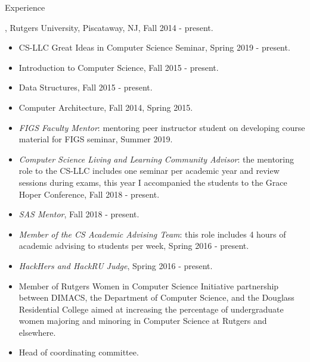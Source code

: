 \documentclass[10pt]{resume}
\begin{document}
\begin{category}{Experience}

  , Rutgers University, Piscataway, NJ, Fall 2014 - present.
  \begin{itemize}
    \item CS-LLC Great Ideas in Computer Science Seminar, Spring 2019 - present.
    \item Introduction to Computer Science, Fall 2015 - present.
    \item Data Structures, Fall 2015 - present.
    \item Computer Architecture, Fall 2014, Spring 2015.
  \end{itemize}

    \begin{itemize}
    \item {\em FIGS Faculty Mentor}: mentoring peer
      instructor student on developing course material for FIGS
      seminar, Summer 2019.
    \item {\em Computer Science Living and Learning Community Advisor}: the
      mentoring role to the CS-LLC includes one seminar per academic
      year and review sessions during exams, this year I 
      accompanied the students to the Grace Hoper Conference, Fall 2018 - present.
    \item {\em SAS Mentor}, Fall 2018 - present.
    \item {\em Member of the CS Academic Advising Team}: this role
      includes 4 hours of academic advising to students per week,
      Spring 2016 - present.
    \item {\em HackHers and HackRU Judge}, Spring 2016 - present.
    \end{itemize}

    \begin{itemize}
    \item Member of Rutgers Women in Computer Science Initiative partnership
      between DIMACS, the Department of Computer Science, and the
      Douglass Residential College aimed at increasing the percentage of
      undergraduate women majoring and minoring in Computer Science at
      Rutgers and elsewhere.
    \item Head of coordinating committee.
    \end{itemize}
    

\end{category}
\end{document}
